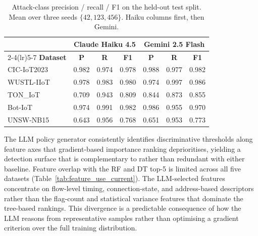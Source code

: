 \begin{table}[htbp]
\centering
\caption{Attack-class precision / recall / F1 on the held-out test split.
  Mean over three seeds $\{42, 123, 456\}$. Haiku columns first, then Gemini.}
\label{tab:attack_precision_current}
\begin{tabular}{lcccccc}
\toprule
 & \multicolumn{3}{c}{\textbf{Claude Haiku 4.5}}
 & \multicolumn{3}{c}{\textbf{Gemini 2.5 Flash}} \\
\cmidrule(lr){2-4}\cmidrule(lr){5-7}
\textbf{Dataset} & \textbf{P} & \textbf{R} & \textbf{F1} & \textbf{P} & \textbf{R} & \textbf{F1} \\
\midrule
CIC-IoT2023 & 0.982 & 0.974 & 0.978 & 0.988 & 0.977 & 0.982 \\
WUSTL-IIoT  & 0.978 & 0.983 & 0.980 & 0.974 & 0.997 & 0.986 \\
TON\_IoT    & 0.709 & 0.943 & 0.809 & 0.844 & 0.873 & 0.855 \\
Bot-IoT     & 0.974 & 0.991 & 0.982 & 0.986 & 0.955 & 0.970 \\
UNSW-NB15   & 0.643 & 0.956 & 0.768 & 0.651 & 0.953 & 0.773 \\
\bottomrule
\end{tabular}
\end{table}


The LLM policy generator consistently identifies discriminative thresholds along feature axes that gradient-based importance ranking deprioritises, yielding a detection surface that is complementary to rather than redundant with either baseline. Feature overlap with the RF and DT top-5 is limited across all five datasets (Table~\ref{tab:feature_use_current}). The LLM-selected features concentrate on flow-level timing, connection-state, and address-based descriptors rather than the flag-count and statistical variance features that dominate the tree-based rankings. This divergence is a predictable consequence of how the LLM reasons from representative samples rather than optimising a gradient criterion over the full training distribution.

